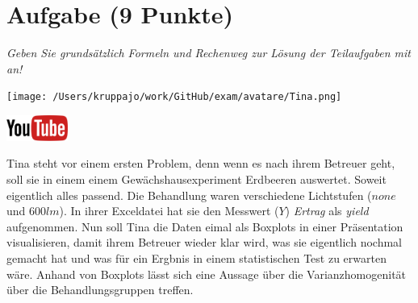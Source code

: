\documentclass[a4paper, 9pt]{scrartcl}\usepackage[]{graphicx}\usepackage[]{xcolor}
\begin{document}
\section{Aufgabe \hfill (9 Punkte)}

\textit{Geben Sie grundsätzlich Formeln und Rechenweg zur Lösung der Teilaufgaben mit an!} \\[1Ex]
 

 
\begin{minipage}[t]{0.5\textwidth}
\texttt{[image: /Users/kruppajo/work/GitHub/exam/avatare/Tina.png]}
\end{minipage}
\begin{minipage}[t]{0.5\textwidth}
\hfill
\href{https://youtu.be/0xc0jIPeiyw}{\includegraphics[width = 2cm]{img/youtube}}\\[1Ex]
\end{minipage}
\vspace{1ex}



Tina steht vor einem ersten Problem, denn wenn es nach ihrem Betreuer geht, soll sie in einem einem Gewächshausexperiment Erdbeeren auswertet. Soweit eigentlich alles passend. Die Behandlung waren verschiedene Lichtstufen ($none$ und $600lm$). In ihrer Exceldatei hat sie den Messwert ($Y$) \textit{Ertrag} als \textit{yield} aufgenommen. Nun soll Tina die Daten eimal als Boxplots in einer Präsentation visualisieren, damit ihrem Betreuer wieder klar wird, was sie eigentlich nochmal gemacht hat und was für ein Ergbnis in einem statistischen Test zu erwarten wäre. Anhand von Boxplots lässt sich eine Aussage über die Varianzhomogenität über die Behandlungsgruppen treffen.
\end{document}
